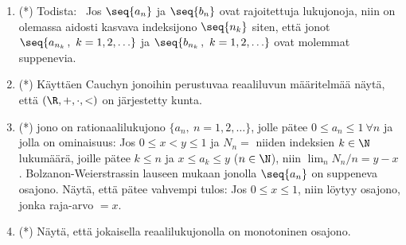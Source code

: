 \begin{enumerate}
\item (*)
Todista: \ Jos $\seq{a_n}$ ja $\seq{b_n}$ ovat rajoitettuja lukujonoja, niin on olemassa 
aidosti kasvava indeksijono $\seq{n_k}$ siten, että jonot $\seq{a_{n_k}\,,\ k=1,2, \ldots}$
ja $\seq{b_{n_k}\,,\ k=1,2, \ldots}$ ovat molemmat suppenevia.

\item (*) Käyttäen Cauchyn jonoihin perustuvaa reaaliluvun määritelmää näytä, että
$(\R,+,\cdot,<)$ on järjestetty kunta.

\item (*) 
jono on rationaalilukujono $\{a_n,\ n=1,2,\ldots\}$, jolle pätee 
$0 \le a_n \le 1\ \forall n$ ja jolla on ominaisuus: Jos $0 \le x < y \le 1$ ja $N_n =$ niiden
indeksien $k\in\N$ lukumäärä, joille pätee $k \le n$ ja $x \le a_k \le y$ ($n\in\N$), niin
$\lim_n N_n/n = y-x$. Bolzanon-Weierstrassin lauseen mukaan jonolla $\seq{a_n}$ on suppeneva
osajono. Näytä, että pätee vahvempi tulos: Jos $0 \le x \le 1$, niin löytyy osajono, jonka
raja-arvo $=x$. 

\item (*)
Näytä, että jokaisella reaalilukujonolla on monotoninen osajono.

\end{enumerate}
